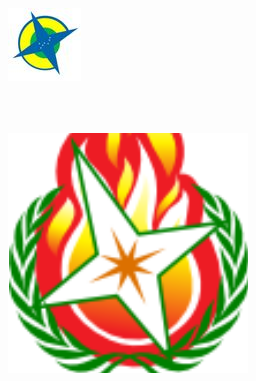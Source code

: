 \documentclass[11pt,a5]{article}
\begin{document}
\begin{figure}[h]
\begin{subfigure}[b]{0.12\textwidth}
        \end{subfigure}%
        ~
        \begin{subfigure}[b]{0.12\textwidth}
                \centering
                \includegraphics[width=\textwidth]{img/logo_geoinquietosten}
        \end{subfigure}%
        ~
        \begin{subfigure}[b]{0.12\textwidth}
                \centering
                \includegraphics[width=\textwidth]{img/logo_geoinquietosval}

\end{subfigure}
\end{figure}
\end{document}
